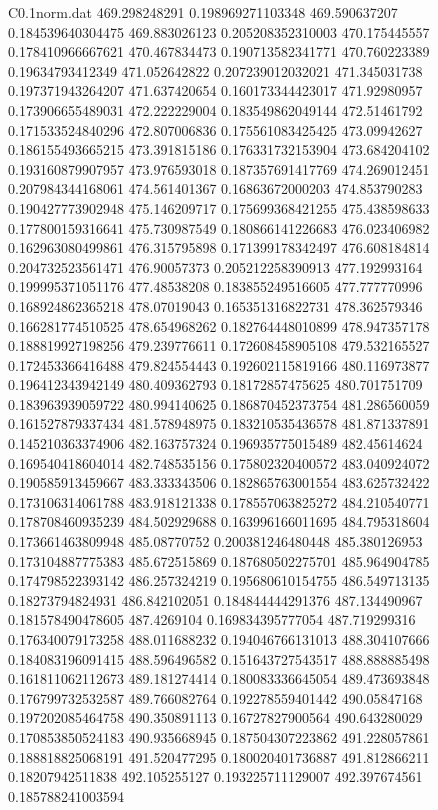 \begin{filecontents}{C0.1norm.dat}
469.298248291		0.198969271103348
469.590637207		0.184539640304475
469.883026123		0.205208352310003
470.175445557		0.178410966667621
470.467834473		0.190713582341771
470.760223389		0.19634793412349
471.052642822		0.207239012032021
471.345031738		0.197371943264207
471.637420654		0.160173344423017
471.92980957		0.173906655489031
472.222229004		0.183549862049144
472.51461792		0.171533524840296
472.807006836		0.175561083425425
473.09942627		0.186155493665215
473.391815186		0.176331732153904
473.684204102		0.193160879907957
473.976593018		0.187357691417769
474.269012451		0.207984344168061
474.561401367		0.16863672000203
474.853790283		0.190427773902948
475.146209717		0.175699368421255
475.438598633		0.177800159316641
475.730987549		0.180866141226683
476.023406982		0.162963080499861
476.315795898		0.171399178342497
476.608184814		0.204732523561471
476.90057373		0.205212258390913
477.192993164		0.199995371051176
477.48538208		0.183855249516605
477.777770996		0.168924862365218
478.07019043		0.165351316822731
478.362579346		0.166281774510525
478.654968262		0.182764448010899
478.947357178		0.188819927198256
479.239776611		0.172608458905108
479.532165527		0.172453366416488
479.824554443		0.192602115819166
480.116973877		0.196412343942149
480.409362793		0.18172857475625
480.701751709		0.183963939059722
480.994140625		0.186870452373754
481.286560059		0.161527879337434
481.578948975		0.183210535436578
481.871337891		0.145210363374906
482.163757324		0.196935775015489
482.45614624		0.169540418604014
482.748535156		0.175802320400572
483.040924072		0.190585913459667
483.333343506		0.182865763001554
483.625732422		0.173106314061788
483.918121338		0.178557063825272
484.210540771		0.178708460935239
484.502929688		0.163996166011695
484.795318604		0.173661463809948
485.08770752		0.200381246480448
485.380126953		0.173104887775383
485.672515869		0.187680502275701
485.964904785		0.174798522393142
486.257324219		0.195680610154755
486.549713135		0.18273794824931
486.842102051		0.184844444291376
487.134490967		0.181578490478605
487.4269104		0.169834395777054
487.719299316		0.176340079173258
488.011688232		0.194046766131013
488.304107666		0.184083196091415
488.596496582		0.151643727543517
488.888885498		0.161811062112673
489.181274414		0.180083336645054
489.473693848		0.176799732532587
489.766082764		0.192278559401442
490.05847168		0.197202085464758
490.350891113		0.16727827900564
490.643280029		0.170853850524183
490.935668945		0.187504307223862
491.228057861		0.188818825068191
491.520477295		0.180020401736887
491.812866211		0.18207942511838
492.105255127		0.193225711129007
492.397674561		0.185788241003594

\end{filecontents}
